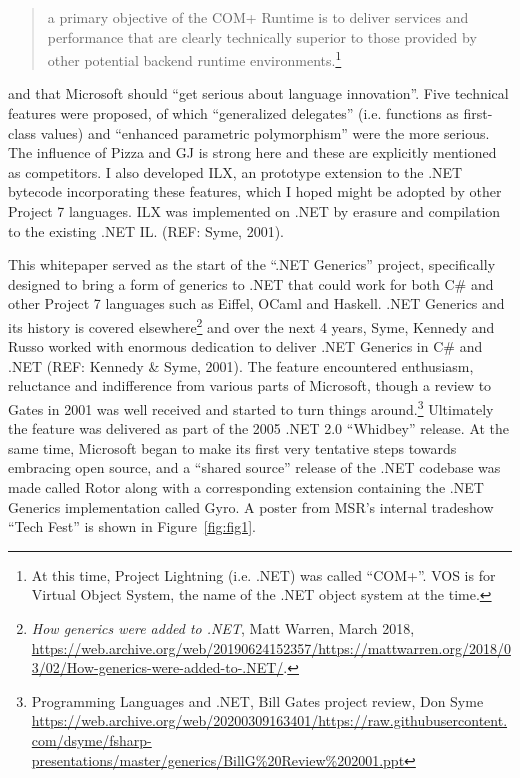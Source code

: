 \documentclass[acmsmall]{acmart}\settopmatter{}
\begin{document}
\begin{quote}
a primary objective of the COM+ Runtime is to deliver services and performance that are clearly technically superior to those provided by other potential backend runtime environments.\footnote{At this time, Project Lightning (i.e. .NET) was called “COM+”.  VOS is for Virtual Object System, the name of the .NET object system at the time.} 
\end{quote}
and that Microsoft should “get serious about language innovation”.  Five technical features were proposed, of which “generalized
delegates” (i.e. functions as first-class values) and “enhanced parametric polymorphism” were the more serious.  The influence of Pizza and GJ is strong here
and these are explicitly mentioned as competitors. I also developed ILX, an prototype extension to the .NET bytecode incorporating these features, which I hoped
might be adopted by other Project 7 languages. ILX was implemented on .NET by erasure and compilation to the existing .NET IL. (REF: Syme, 2001).


This whitepaper served as the start of the “.NET Generics” project, specifically designed to bring a form of generics to .NET that could work for both C\# and other
Project 7 languages such as Eiffel, OCaml and Haskell. .NET Generics and its history is covered elsewhere\footnote{\textit{How generics were added to .NET}, Matt
Warren, March 2018, \url{https://web.archive.org/web/20190624152357/https://mattwarren.org/2018/03/02/How-generics-were-added-to-.NET/}.} and over the next 4 years, Syme, Kennedy and Russo worked with
enormous dedication to deliver .NET Generics in C\# and .NET (REF: Kennedy \& Syme, 2001). The feature encountered enthusiasm, reluctance and indifference from
various parts of Microsoft, though a review to Gates in 2001 was well received and started to turn things around.\footnote{ Programming Languages and  .NET, Bill Gates
project review, Don Syme \url{https://web.archive.org/web/20200309163401/https://raw.githubusercontent.com/dsyme/fsharp-presentations/master/generics/BillG\%20Review\%202001.ppt}}   Ultimately the feature was
delivered as part of the 2005 .NET 2.0 “Whidbey” release.  At the same time, Microsoft began to make its first very tentative steps towards embracing open
source, and a “shared source” release of the .NET codebase was made called Rotor along with a corresponding extension containing the .NET Generics implementation
called Gyro.  A poster from MSR’s internal tradeshow “Tech Fest” is shown in Figure~\ref{fig:fig1}. 
\end{document}
